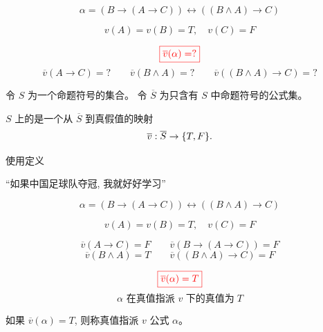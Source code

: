 \begin{frame}{}
  \[
    \alpha = (B \to (A \to C)) \leftrightarrow ((B \land A) \to C)
  \]

  \[
    v(A) = v(B) = T, \quad v(C) = F
  \]

  \pause
  \[
    \textcolor{red}{\boxed{\overline{v}(\alpha) = ?}}
  \]
  \pause
  \[
    \overline{v}(A \to C) = ?
    \qquad \overline{v}(B \land A) = ?
    \qquad \overline{v}((B \land A) \to C) = ?
  \]

  \pause
  \begin{definition}
    令 $S$ 为一个命题符号的集合。
    令 $\overline{S}$ 为只含有 $S$ 中命题符号的公式集。

    $S$ 上的是一个从 $\overline{S}$ 到真假值的映射
    \[
      \overline{v}: \overline{S} \to \{T, F\}.
    \]
  \end{definition}
\end{frame}

\begin{frame}{}
  \begin{center}
    使用定义

    \vspace{0.30cm}
    \begin{definition}
      
    \end{definition}

    \vspace{0.60cm}
    ``如果中国足球队夺冠, 我就好好学习''

  \end{center}
\end{frame}

\begin{frame}{}
  \[
    \alpha = (B \to (A \to C)) \leftrightarrow ((B \land A) \to C)
  \]

  \[
    v(A) = v(B) = T, \quad v(C) = F
  \]

  \pause
  \[
    \overline{v}(A \to C) = F
    \qquad \overline{v}(B \to (A \to C)) = F
  \]
  \[
    \overline{v}(B \land A) = T
    \qquad \overline{v}((B \land A) \to C) = F
  \]

  \pause
  \[
    \textcolor{red}{\boxed{\overline{v}(\alpha) = T}}
  \]
  \[
    \alpha \text{ 在真值指派 $v$ 下的真值为}\; T
  \]

  \pause
  \begin{definition}[满足 (Satisfy)]
    如果 $\overline{v}(\alpha) = T$, 则称真值指派 $v$ 公式 $\alpha$。
  \end{definition}
\end{frame}

